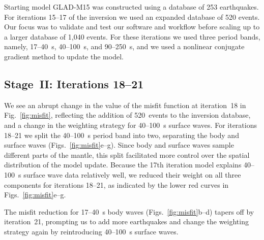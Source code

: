 Starting model GLAD-M15 was constructed using a database of 253 earthquakes.
For iterations 15--17 of the inversion we used an expanded database of 520 events.
Our focus was to validate and test our software and workflow before scaling up
to a larger database of 1,040 events.
For these iterations we used three period bands, namely,
17--40~s, 40--100~s, and 90--250~s,
and we used a nonlinear conjugate
gradient method to update the model.

\subsection{Stage~II: Iterations 18--21}

We see an abrupt change in the value of the misfit function at iteration~18
in Fig.~\ref{fig:misfit},
reflecting the addition of 520~events to the inversion database,
and a change in the weighting strategy for 40--100~s surface waves.
For iterations 18--21 we split the 40--100~s period band into two, separating the
body and surface waves (Figs.~\ref{fig:misfit}e--g).
Since body and surface waves sample different parts of the mantle,
this split facilitated more control over the spatial distribution of the model update.
Because the 17th iteration model explains 40--100~s surface wave data relatively well,
we reduced their weight on all three components for iterations 18--21,
as indicated by the lower red curves in Figs.~\ref{fig:misfit}e--g.

The misfit reduction for 17--40~s body waves (Figs.~\ref{fig:misfit}b--d) tapers off by
iteration~21, prompting us to add more earthquakes and change the weighting strategy again by reintroducing 40--100~s surface waves.




